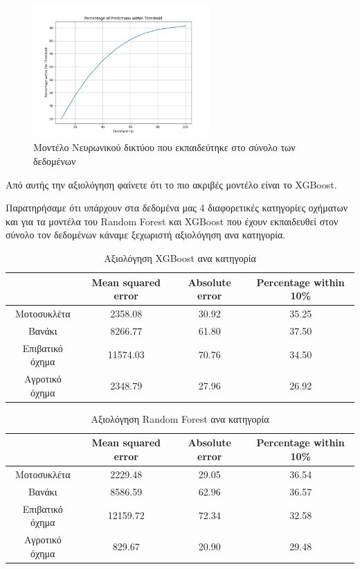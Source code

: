 \documentclass{llncs}
\begin{document}
\begin{figure}
    \begin{center}
        \includegraphics[width=0.6\textwidth]{images/neural_network_all_thresholds.png}
    \end{center}
    \caption{Μοντέλο Νευρωνικού δικτύου που εκπαιδεύτηκε στο σύνολο των δεδομένων}  
    \label{fig:neural_result}  
\end{figure}


Από αυτής την αξιολόγηση φαίνετε ότι το πιο ακριβές μοντέλο
είναι το XGBoost.

Παρατηρήσαμε ότι υπάρχουν στα δεδομένα μας 4 διαφορετικές κατηγορίες οχήματων και
για τα μοντέλα του Random Forest και XGBoost που έχουν εκπαιδευθεί στον σύνολο τον δεδομένων
κάναμε ξεχωριστή αξιολόγηση ανα κατηγορία.
\begin{table}[h]
    \centering
    \begin{tabular}{|c|c|c|c|} %
        \hline
         &Mean squared error & Absolute error & Percentage within 10\% \\ %
        \hline
        Μοτοσυκλέτα & 2358.08 & 30.92 & 35.25 \\
        Βανάκι & 8266.77 & 61.80 & 37.50 \\
        Επιβατικό όχημα & 11574.03 & 70.76 & 34.50 \\
        Αγροτικό όχημα & 2348.79 & 27.96 & 26.92 \\
        \hline
    \end{tabular}
    \caption{Αξιολόγηση XGBoost ανα κατηγορία}
    \label{tab:XGBoost_cat_together}
\end{table}

\begin{table}[h]
    \centering
    \begin{tabular}{|c|c|c|c|} %
        \hline
         &Mean squared error & Absolute error & Percentage within 10\% \\ %
        \hline
        Μοτοσυκλέτα & 2229.48 & 29.05 & 36.54 \\
        Βανάκι & 8586.59 & 62.96 & 36.57 \\
        Επιβατικό όχημα & 12159.72 & 72.34 & 32.58 \\
        Αγροτικό όχημα & 829.67 & 20.90 & 29.48 \\
        \hline
    \end{tabular}
    \caption{Αξιολόγηση Random Forest ανα κατηγορία}
    \label{tab:RandomForest_cat_together}
\end{table}
\end{document}
